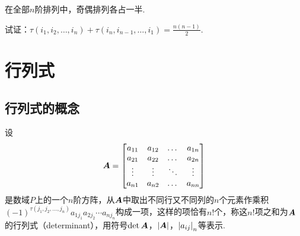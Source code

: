 \begin{theorem}
在全部\(n\)阶排列中，奇偶排列各占一半.
\end{theorem}

\begin{example}
试证：\(\tau(i_1,i_2,\dotsc,i_n)+\tau(i_n,i_{n-1},\dotsc,i_1)=\frac{n(n-1)}{2}\).
\end{example}

\section{行列式}
\subsection{行列式的概念}
\begin{definition}
设\begin{align*}\boldsymbol{A} = \begin{bmatrix}
a_{11} & a_{12} & \dots & a_{1n} \\
a_{21} & a_{22} & \dots & a_{2n} \\
\vdots & \vdots & \ddots & \vdots \\
a_{n1} & a_{n2} & \dots & a_{nn}
\end{bmatrix}\end{align*}
是数域\(P\)上的一个\(n\)阶方阵，从\(\boldsymbol{A}\)中取出不同行又不同列的\(n\)个元素作乘积\((-1)^{\tau(j_1,j_2,\dotsc,j_n)} a_{1j_1} a_{2j_2} \dotsm a_{nj_n}\)构成一项，这样的项恰有\(n!\)个，称这\(n!\)项之和为\(\boldsymbol{A}\)的行列式（determinant），用符号\(\det \boldsymbol{A}\)，\(\abs{\boldsymbol{A}}\)，\(\abs{a_{ij}}_{n}\)等表示.
\end{definition}

